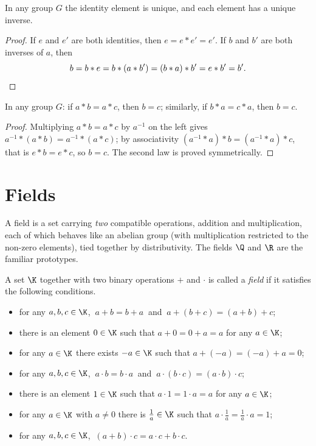\begin{fact}
In any group $G$ the identity element is unique, and each element has a unique inverse.
\end{fact}

\begin{proof}
If $e$ and $e'$ are both identities, then $e=e*e'=e'$. If $b$ and $b'$ are both inverses of $a$, then
\[
b = b*e = b*(a*b') = (b*a)*b' = e*b' = b'. \qedhere
\]
\end{proof}

\begin{fact}
In any group $G$: if $a*b = a*c$, then $b=c$; similarly, if $b*a = c*a$, then $b=c$.
\end{fact}

\begin{proof}
Multiplying $a*b=a*c$ by $a^{-1}$ on the left gives $a^{-1}*(a*b) = a^{-1}*(a*c)$; by associativity
$(a^{-1}*a)*b = (a^{-1}*a)*c$, that is $e*b = e*c$, so $b=c$. The second law is proved symmetrically.
\end{proof}

\section{Fields}

A field is a set carrying \emph{two} compatible operations, addition and multiplication, each of which behaves
like an abelian group (with multiplication restricted to the non-zero elements), tied together by
distributivity. The fields $\Q$ and $\R$ are the familiar prototypes.

\begin{definition}
A set $\K$ together with two binary operations $+$ and $\cdot$ is called a \emph{field} if it satisfies the
following conditions.
\begin{itemize}
\item for any $a,b,c\in \K$, $\ a+b=b+a\ $ and $\ a+(b+c)=(a+b)+c$;
\item there is an element $0\in \K$ such that $a+0=0+a=a$ for any $a\in \K$;
\item for any $a\in \K$ there exists $-a\in \K$ such that $a+(-a)=(-a)+a=0$;
\item for any $a,b,c\in \K$, $\ a\cdot b = b\cdot a\ $ and $\ a\cdot(b\cdot c)=(a\cdot b)\cdot c$;
\item there is an element $1\in \K$ such that $a\cdot 1=1\cdot a=a$ for any $a\in \K$;
\item for any $a\in \K$ with $a\neq 0$ there is $\tfrac{1}{a}\in \K$ such that
$a \cdot \tfrac{1}{a} = \tfrac{1}{a}\cdot a = 1$;
\item for any $a,b,c\in \K$, $\ (a+b)\cdot c = a\cdot c + b\cdot c$.
\end{itemize}
\end{definition}

